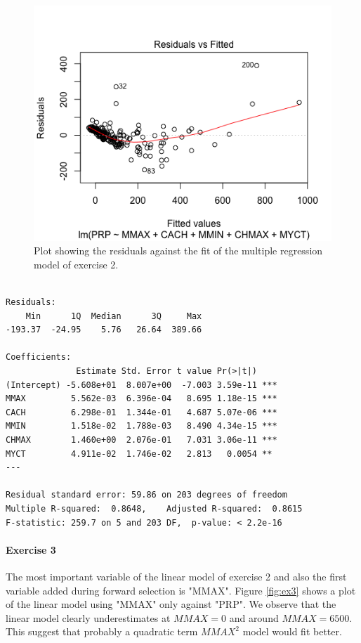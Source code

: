\documentclass{paper}
\begin{document}
\begin{figure}
  \begin{center}
    \quad\quad
    \includegraphics[width=.8\linewidth]{res2}
  \end{center}
  \caption{Plot showing the residuals against the fit of the multiple regression
   model of exercise 2.}
   \label{fig:res2}
\end{figure}

\begin{minipage}{\linewidth}
  \begin{lstlisting}[caption={Summary of multiple regression fit for exercise 2},
    label=list:res2]

Residuals:
    Min      1Q  Median      3Q     Max
-193.37  -24.95    5.76   26.64  389.66

Coefficients:
              Estimate Std. Error t value Pr(>|t|)
(Intercept) -5.608e+01  8.007e+00  -7.003 3.59e-11 ***
MMAX         5.562e-03  6.396e-04   8.695 1.18e-15 ***
CACH         6.298e-01  1.344e-01   4.687 5.07e-06 ***
MMIN         1.518e-02  1.788e-03   8.490 4.34e-15 ***
CHMAX        1.460e+00  2.076e-01   7.031 3.06e-11 ***
MYCT         4.911e-02  1.746e-02   2.813   0.0054 **
---

Residual standard error: 59.86 on 203 degrees of freedom
Multiple R-squared:  0.8648,	Adjusted R-squared:  0.8615
F-statistic: 259.7 on 5 and 203 DF,  p-value: < 2.2e-16

  \end{lstlisting}
\end{minipage}

\paragraph{Exercise 3}
The most important variable of the linear model of exercise 2 and also the first
variable added during forward selection is "MMAX". Figure \ref{fig:ex3} shows a
plot of the linear model using "MMAX" only against "PRP". We observe that the linear
model clearly underestimates at $MMAX=0$ and around $MMAX=6500$. This suggest that
probably a quadratic term $MMAX^2$ model would fit better.
\end{document}
